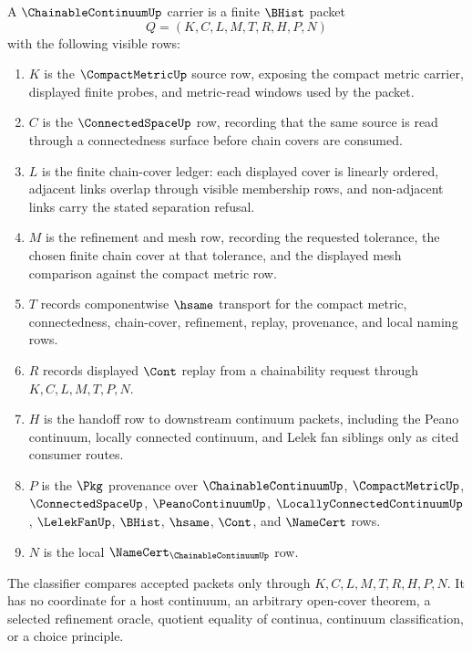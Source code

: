 \begin{definition}
\label{def:chainable-continuum-carrier}
A $\ChainableContinuumUp$ carrier is a finite $\BHist$ packet
$$
Q=(K,C,L,M,T,R,H,P,N)
$$
with the following visible rows:
\begin{enumerate}
\item $K$ is the $\CompactMetricUp$ source row, exposing the compact metric carrier, displayed finite probes, and metric-read windows used by the packet.
\item $C$ is the $\ConnectedSpaceUp$ row, recording that the same source is read through a connectedness surface before chain covers are consumed.
\item $L$ is the finite chain-cover ledger: each displayed cover is linearly ordered, adjacent links overlap through visible membership rows, and non-adjacent links carry the stated separation refusal.
\item $M$ is the refinement and mesh row, recording the requested tolerance, the chosen finite chain cover at that tolerance, and the displayed mesh comparison against the compact metric row.
\item $T$ records componentwise $\hsame$ transport for the compact metric, connectedness, chain-cover, refinement, replay, provenance, and local naming rows.
\item $R$ records displayed $\Cont$ replay from a chainability request through $K,C,L,M,T,P,N$.
\item $H$ is the handoff row to downstream continuum packets, including the Peano continuum, locally connected continuum, and Lelek fan siblings only as cited consumer routes.
\item $P$ is the $\Pkg$ provenance over $\ChainableContinuumUp$, $\CompactMetricUp$, $\ConnectedSpaceUp$, $\PeanoContinuumUp$, $\LocallyConnectedContinuumUp$, $\LelekFanUp$, $\BHist$, $\hsame$, $\Cont$, and $\NameCert$ rows.
\item $N$ is the local $\NameCert_{\ChainableContinuumUp}$ row.
\end{enumerate}
The classifier compares accepted packets only through $K,C,L,M,T,R,H,P,N$. It has no coordinate for a host continuum, an arbitrary open-cover theorem, a selected refinement oracle, quotient equality of continua, continuum classification, or a choice principle.
\end{definition}

